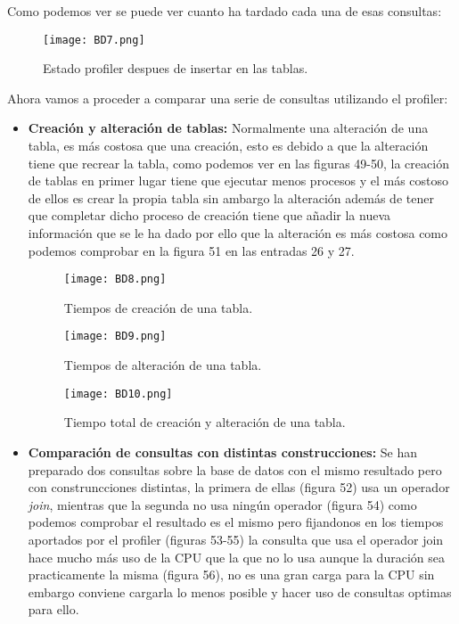 \documentclass[a4paper, 11pt]{article} %
\begin{document}
Como podemos ver se puede ver cuanto ha tardado cada una de esas consultas:
\begin{figure}[H]
\centering 
\texttt{[image: BD7.png]} 
\caption{Estado profiler despues de insertar en las tablas.} 
\label{contexto:figura} 
\end{figure}

Ahora vamos a proceder a comparar una serie de consultas utilizando el profiler:
\begin{itemize}
\item \textbf{Creación y alteración de tablas:} Normalmente una alteración de una tabla, es más costosa que una creación, esto es debido a que la alteración tiene que recrear la tabla, como podemos ver en las figuras 49-50, la creación de tablas en primer lugar tiene que ejecutar menos procesos y el más costoso de ellos es crear la propia tabla sin ambargo la alteración además de tener que completar dicho proceso de creación tiene que añadir la nueva información que se le ha dado por ello que la alteración es más costosa como podemos comprobar en la figura 51 en las entradas 26 y 27.

\begin{figure}[H]
\centering 
\texttt{[image: BD8.png]} 
\caption{Tiempos de creación de una tabla.} 
\label{contexto:figura} 
\end{figure}

\begin{figure}[H]
\centering 
\texttt{[image: BD9.png]} 
\caption{Tiempos de alteración de una tabla.} 
\label{contexto:figura} 
\end{figure}

\begin{figure}[H]
\centering 
\texttt{[image: BD10.png]} 
\caption{Tiempo total de creación y alteración de una tabla.} 
\label{contexto:figura} 
\end{figure}

\item \textbf{Comparación de consultas con distintas construcciones:} Se han preparado dos consultas sobre la base de datos con el mismo resultado pero con construncciones distintas, la primera de ellas (figura 52) usa un operador \textit{join}, mientras que la segunda no usa ningún operador (figura 54) como podemos comprobar el resultado es el mismo pero fijandonos en los tiempos aportados por el profiler (figuras 53-55) la consulta que usa el operador join hace mucho más uso de la CPU que la que no lo usa aunque la duración sea practicamente la misma (figura 56), no es una gran carga para la CPU sin embargo conviene cargarla lo menos posible y hacer uso de consultas optimas para ello.


\end{itemize}
\end{document}
